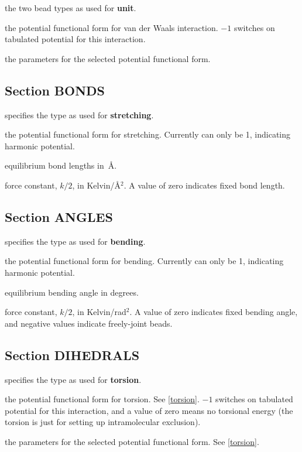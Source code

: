 \documentclass[12pt,letterpaper]{article}
\begin{document}
 the two bead types as used for {\bf
  unit}.

 the potential functional form for van
der Waals interaction. $-1$ switches on tabulated potential
for this interaction.

 the parameters for the
selected potential functional form.

\subsection{Section \textbf{BONDS}}
\label{bonds}

 specifies the type as used for {\bf
  stretching}.

 the potential functional form for
stretching. Currently can only be 1, indicating harmonic
potential.

 equilibrium bond lengths in~\AA.

 force constant, $k/2$, in
Kelvin/\AA$^2$. A value of zero indicates fixed bond length.

\subsection{Section \textbf{ANGLES}}
\label{angles}
 specifies the type as used for {\bf
  bending}.

 the potential functional form for
bending. Currently can only be 1, indicating harmonic
potential.

 equilibrium bending angle in degrees.

 force constant, $k/2$, in
Kelvin/rad$^2$. A value of zero indicates fixed bending
angle, and negative values indicate freely-joint beads.

\subsection{Section \textbf{DIHEDRALS}}
\label{dihedrals}
 specifies the type as used for {\bf
  torsion}.

 the potential functional form for
torsion. See \ref{torsion}. $-1$ switches on tabulated
potential for this interaction, and a value of zero means no
torsional energy (the torsion is just for setting up
intramolecular exclusion).

 the parameters for the selected
potential functional form. See \ref{torsion}.
\end{document}
